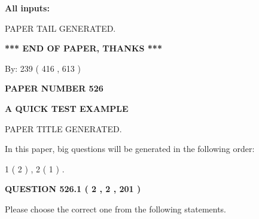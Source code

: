 \documentclass[12pt]{article}
\begin{document}
   
   
   
\noindent{}
   
   
   
   
\noindent\vspace{0.1in}\hspace{-0.08in} {\textbf{\Large{All inputs: }}}
   
   
   
   
   
   
 \vspace{0.2in}
 
   
   
\vspace{2.0in} PAPER TAIL GENERATED.
   
   
   
   
\vspace{1.0in} 
{\textbf{\large{ *** END OF PAPER, THANKS *** }}} 
   
   
\hspace{1.0in} By: 
 239 ( 416 ,  613 )
   
   
   
   
\newpage 
\setcounter{page}{ 
   526001 } 
   
   
   
   
 {\textbf{ \Large{ PAPER NUMBER  526  }}}
   
   
\vspace{0.2in}
   
   
   
   
   
   
   
   
 \vspace{0.2in}
{\LARGE {\textbf{ A QUICK TEST EXAMPLE}}}
   
   
 PAPER TITLE GENERATED.
   
   
   
\vspace{0.2in}
   
In this paper, big questions will be generated in the following order: 
   
   
   1 ( 2 )
 ,
   2 ( 1 )
 .
  
\vspace{0.2in}
  
{\textbf{\Large{QUESTION
526.1 
 ( 2 , 2 , 201 )
}}}
  
  
Please choose the correct one from the following statements.
 
\end{document}
